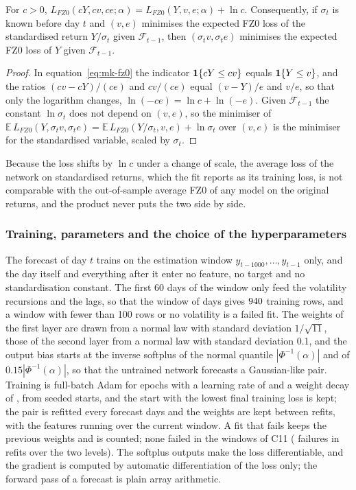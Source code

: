 \begin{proposition}
\label{prop:mk-scale}
For $c>0$, $L_{FZ0}(cY,cv,ce;\alpha)=L_{FZ0}(Y,v,e;\alpha)+\ln c$. Consequently, if $\sigma_t$ is known before day $t$ and $(v,e)$ minimises the expected FZ0 loss of the standardised return $Y/\sigma_t$ given $\mathcal F_{t-1}$, then $(\sigma_tv,\sigma_te)$ minimises the
expected FZ0 loss of $Y$ given $\mathcal F_{t-1}$.
\end{proposition}
\begin{proof}
In equation~\eqref{eq:mk-fz0} the indicator $\mathbf{1}\{cY\le cv\}$ equals $\mathbf{1}\{Y\le v\}$, and the ratios $(cv-cY)/(ce)$ and $cv/(ce)$ equal $(v-Y)/e$ and $v/e$, so that only the logarithm changes, $\ln(-ce)=\ln c+\ln(-e)$. Given
$\mathcal F_{t-1}$ the constant $\ln\sigma_t$ does not depend on $(v,e)$, so the minimiser of $\mathbb E\,L_{FZ0}(Y,\sigma_tv,\sigma_te)=\mathbb E\,L_{FZ0}(Y/\sigma_t,v,e)+\ln\sigma_t$ over $(v,e)$ is the minimiser for the
standardised variable, scaled by $\sigma_t$.
\end{proof}

Because the loss shifts by $\ln c$ under a change of scale, the average loss of the network on standardised returns, which the fit reports as its training loss, is not comparable with the out-of-sample
average FZ0 of any model on the original returns, and the product never puts the two side by side.

\subsubsection{Training, parameters and the choice of the hyperparameters}
The forecast of day $t$ trains on the estimation window $y_{t-1000},\dots,y_{t-1}$ only, and the day itself and everything after it enter no feature, no target and no standardisation constant. The first 60 days of the
window only feed the volatility recursions and the lags, so that the window of \mkNnWin{} days gives $940{}$ training rows, and a window with fewer than 100 rows or no volatility is a failed fit. The weights of
the first layer are drawn from a normal law with standard deviation $1/\sqrt{11}$, those of the second layer from a normal law with standard deviation 0.1, and the output bias starts at the inverse softplus of the
normal quantile $|\Phi^{-1}(\alpha)|$ and of $0.15|\Phi^{-1}(\alpha)|$, so that the untrained network forecasts a Gaussian-like pair. Training is full-batch Adam \citep{market:kingma2015adam} for \mkNnEpochs{} epochs with a learning rate of \mkNnLr{} and a weight decay of
\mkNnWd{}, from \mkNnStarts{} seeded starts, and the start with the lowest final training loss is kept; the pair is refitted every \mkNnRefit{} forecast days and the weights are kept between refits, with the features
running over the current window. A fit that fails keeps the previous weights and is counted; none failed in the windows of C11 (\mkNnFailures{} failures in \mkNnRefits{} refits over the two levels). The softplus outputs make the loss
differentiable, and the gradient is computed by automatic differentiation of the loss only; the forward pass of a forecast is plain array arithmetic.

